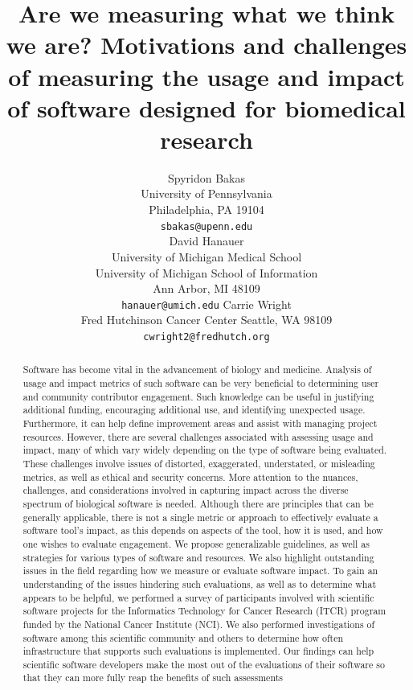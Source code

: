 \documentclass{article}
\title{Are we measuring what we think we are? Motivations and challenges of measuring the usage and impact of software designed for biomedical research}
\author{
Spyridon Bakas \\
    University of Pennsylvania \\
    Philadelphia, PA 19104 \\
    \texttt{sbakas@upenn.edu} \\
\AND
David Hanauer \\
    University of Michigan Medical School\\
    University of Michigan School of Information\\
    Ann Arbor, MI 48109\\
    \texttt{hanauer@umich.edu}
\AND
Carrie Wright \\
    Fred Hutchinson Cancer Center
    Seattle, WA 98109 \\
    \texttt{cwright2@fredhutch.org}\\
}
\begin{document}
\maketitle
\begin{abstract}
Software has become vital in the advancement of biology and medicine. Analysis of usage and impact metrics of such software can be very beneficial to determining user and community contributor engagement. Such knowledge can be useful in justifying additional funding, encouraging additional use, and identifying unexpected usage. Furthermore, it can help define improvement areas and assist with managing project resources. However, there are several challenges associated with assessing usage and impact, many of which vary widely depending on the type of software being evaluated. These challenges involve issues of distorted, exaggerated, understated, or misleading metrics, as well as ethical and security concerns.  More attention to the nuances, challenges, and considerations involved in capturing impact across the diverse spectrum of biological software is needed. Although there are principles that can be generally applicable, there is not a single metric or approach to effectively evaluate a software tool’s impact, as this depends on aspects of the tool, how it is used, and how one wishes to evaluate engagement. We propose generalizable guidelines, as well as strategies for various types of software and resources. We also highlight outstanding issues in the field regarding how we measure or evaluate software impact. To gain an understanding of the issues hindering such evaluations, as well as to determine what appears to be helpful, we performed a survey of participants involved with scientific software projects for the Informatics Technology for Cancer Research (ITCR) program funded by the National Cancer Institute (NCI). We also performed investigations of software among this scientific community and others to determine how often infrastructure that supports such evaluations is implemented.  Our findings can help scientific software developers make the most out of the evaluations of their software so that they can more fully reap the benefits of such assessments
\end{abstract}


\end{document}
